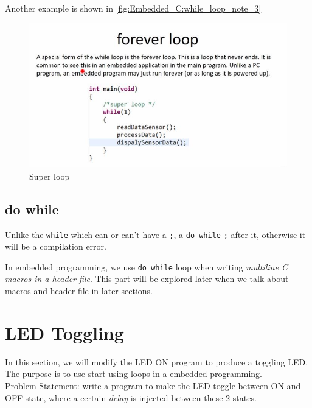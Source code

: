 \begin{enumerate}
\newpage    
Another example is shown in \autoref{fig:Embedded_C:while_loop_note_3}   
   
\begin{figure}[h]
\centering
\includegraphics[scale=0.7]{Figures/Embedded_C/while_loop_note_3}
\caption{Super loop}
\label{fig:Embedded_C:while_loop_note_3}
\end{figure}     
    
\end{enumerate}

\subsection{do while}

Unlike the \verb|while| which can or can't have a \verb|;|, a \verb|do while|  \verb|;| after it, otherwise it will be a compilation error.

In embedded programming, we use \verb|do while| loop when writing \textit{multiline C macros in a header file}. This part will be explored later when we talk about macros and header file in later sections.

\newpage
\section{LED Toggling}
\label{Sec:LED_Toggling}

In this section, we will modify the LED ON program to produce a toggling LED. The purpose is to use start using loops in a embedded programming.\\

\underline{Problem Statement:} write a program to make the LED toggle between ON and OFF state, where a certain \textit{delay} is injected between these 2 states.\\

